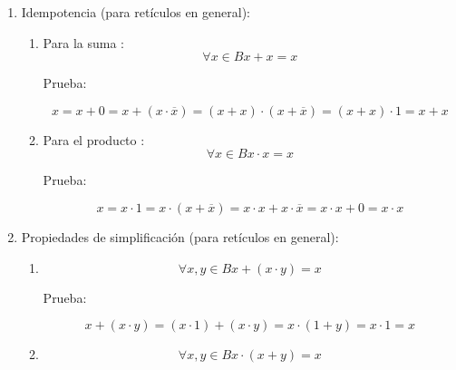 \begin{enumerate}
\begin{enumerate}
\begin{enumerate}
\begin{enumerate}
        Prueba:

        \[\forall{x \in B}{x + 0}{=}x\]

        \[\forall{x \in B}{\exists\mathtt{\mathrm{!}}}{\overline{x} \in B}{{{\overline{x} \cdot {({x + 0})}} = {\overline{x} \cdot x}} = 0}\]

        \[\forall{x \in B}{\exists\mathtt{\mathrm{!}}}{\overline{x} \in B}{{{0 = {\overline{x} \cdot {({x + 1})}}} = {{({\overline{x} \cdot x})} + {({\overline{x} \cdot 0})}}} = {\overline{x} \cdot 0}}\]

        \[\forall{x \in B}{\exists\mathtt{\mathrm{!}}}{\overline{x} \in B}{0 = {\overline{x} \cdot 0}}\]

        \[\forall{x \in B}{\exists\mathtt{\mathrm{!}}}{\overline{x} \in B}{\exists\mathtt{\mathrm{!}}}{\overline{\overline{x}} \in B}{0 = {\overline{x} \cdot 0}} \land {0 = {\overline{\overline{x}} \cdot 0}}\]

        \[\forall{x \in B}{0 = {x \cdot 0}}\]
      \end{enumerate}
    \item
      Idempotencia (para retículos en general):

      \begin{enumerate}
      \def\labelenumiv{\arabic{enumiv}.}
      \item
        Para la suma :\[\forall{x \in B}{{x + x} = x}\]

        Prueba:

        \[{{{{x = {x + 0}} = {x + {({x \cdot \overline{x}})}}} = {{({x + x})} \cdot {({x + \overline{x}})}}} = {{({x + x})} \cdot 1}} = {x + x}\]
      \item
        Para el producto : \[\forall{x \in B}{{x \cdot x} = x}\]

        Prueba:

        \[{{{{x = {x \cdot 1}} = {x \cdot {({x + \overline{x}})}}} = {{x \cdot x} + {x \cdot \overline{x}}}} = {{x \cdot x} + 0}} = {x \cdot x}\]
      \end{enumerate}
    \item
      Propiedades de simplificación (para retículos en general):

      \begin{enumerate}
      \def\labelenumiv{\arabic{enumiv}.}
      \item
        \[\forall x,{y \in B}{{x + {({x \cdot y})}} = x}\]

        Prueba:

        \[{{{{x + {({x \cdot y})}} = {{({x \cdot 1})} + {({x \cdot y})}}} = {x \cdot {({1 + y})}}} = {x \cdot 1}} = x\]
      \item
        \[\forall x,{y \in B}{{x \cdot {({x + y})}} = x}\]


\end{enumerate}
\end{enumerate}
\end{enumerate}
\end{enumerate}
